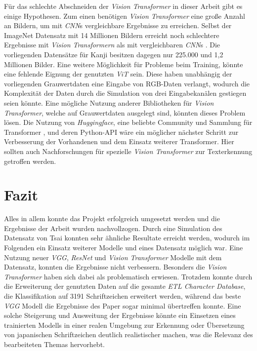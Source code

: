 \documentclass[twoside,a4paper]{IEEEtran}
\begin{document}
Für das schlechte Abschneiden der \emph{Vision Transformer} in dieser Arbeit gibt es einige Hypothesen. Zum einen benötigen \emph{Vision Transformer} eine große Anzahl an Bildern, um mit \emph{CNN}s vergleichbare Ergebnisse zu erreichen. Selbst der ImageNet Datensatz mit 14 Millionen Bildern \cite{IMAGENET} erreicht noch schlechtere Ergebnisse mit \emph{Vision Transformern} als mit vergleichbaren \emph{CNN}s \cite{JFT}. Die vorliegenden Datensätze für Kanji besitzen dagegen nur 225.000 und 1,2 Millionen Bilder. Eine weitere Möglichkeit für Probleme beim Training, könnte eine fehlende Eignung der genutzten \emph{ViT} sein. Diese haben unabhängig der vorliegenden Grauwertdaten eine Eingabe von RGB-Daten verlangt, wodurch die Komplexität der Daten durch die Simulation von drei Eingabekanälen gestiegen seien könnte. Eine mögliche Nutzung anderer Bibliotheken für \emph{Vision Transformer}, welche auf Grauwertdaten ausgelegt sind, könnten dieses Problem lösen. Die Nutzung von \emph{Huggingface}, eine beliebte Community und Sammlung für Transformer \cite{huggingface}, und deren Python-API wäre ein möglicher nächster Schritt zur Verbesserung der Vorhandenen und dem Einsatz weiterer Transformer. Hier sollten auch Nachforschungen für spezielle \emph{Vision Transformer} zur Texterkennung getroffen werden. 

\section{Fazit} %
Alles in allem konnte das Projekt erfolgreich umgesetzt werden und die Ergebnisse der Arbeit \cite{RHC} wurden nachvollzogen. Durch eine Simulation des Datensatz von Tsai konnten sehr ähnliche Resultate erreicht werden, wodurch im Folgenden ein Einsatz weiterer Modelle und eines Datensatz möglich war. Eine Nutzung neuer \emph{VGG}, \emph{ResNet} und \emph{Vision Transformer} Modelle mit dem Datensatz, konnten die Ergebnisse nicht verbessern. Besonders die \emph{Vision Transformer} haben sich dabei als problematisch erwiesen. Trotzdem konnte durch die Erweiterung der genutzten Daten auf die gesamte \emph{ETL Character Database}, die Klassifikation auf 3191 Schriftzeichen erweitert werden, während das beste \emph{VGG} Modell die Ergebnisse des Paper \cite{RHC} sogar minimal übertreffen konnte. Eine solche Steigerung und Ausweitung der Ergebnisse könnte ein Einsetzen eines trainierten Modells in einer realen Umgebung zur Erkennung oder Übersetzung von japanischen Schriftzeichen deutlich realistischer machen, was die Relevanz des bearbeiteten Themas hervorhebt.
\end{document}
